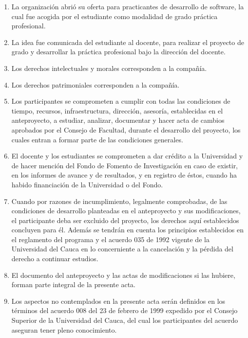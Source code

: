 \begin{enumerate}
    \item La organización abrió su oferta para practicantes de desarrollo de software, la cual fue acogida por el estudiante como modalidad de grado práctica profesional.
    \item La idea fue comunicada del estudiante al docente, para realizar el proyecto de grado y desarrollar la práctica profesional bajo la dirección del docente. 
    \item Los derechos intelectuales y morales corresponden a la compañía.
    \item Los derechos patrimoniales corresponden a la compañía. 
    \item Los participantes se comprometen a cumplir con todas las condiciones de tiempo, recursos, infraestructura, dirección, asesoría, establecidas en el anteproyecto, a estudiar, analizar, documentar y hacer acta de cambios aprobados por el Consejo de Facultad, durante el desarrollo del proyecto, los cuales entran a formar parte de las condiciones generales.
    \item El docente y los estudiantes se comprometen a dar crédito a la Universidad y de hacer mención del Fondo de Fomento de Investigación en caso de existir, en los informes de avance y de resultados, y en registro de éstos, cuando ha habido financiación de la Universidad o del Fondo.
    \item Cuando por razones de incumplimiento, legalmente comprobadas, de las condiciones de desarrollo planteadas en el anteproyecto y sus modificaciones, el participante deba ser excluido del proyecto, los derechos aquí establecidos concluyen para él. Además se tendrán en cuenta los principios establecidos en el reglamento del programa y el acuerdo 035 de 1992 vigente de la Universidad del Cauca en lo concerniente a la cancelación y la pérdida del derecho a continuar estudios. 
    \item El documento del anteproyecto y las actas de modificaciones si las hubiere, forman parte integral de la presente acta.
    \item Los aspectos no contemplados en la presente acta serán definidos en los términos del acuerdo 008 del 23 de febrero de 1999 expedido por el Consejo Superior de la Universidad del Cauca, del cual los participantes del acuerdo aseguran tener pleno conocimiento. \\ \\ \\ \\
\end{enumerate}

